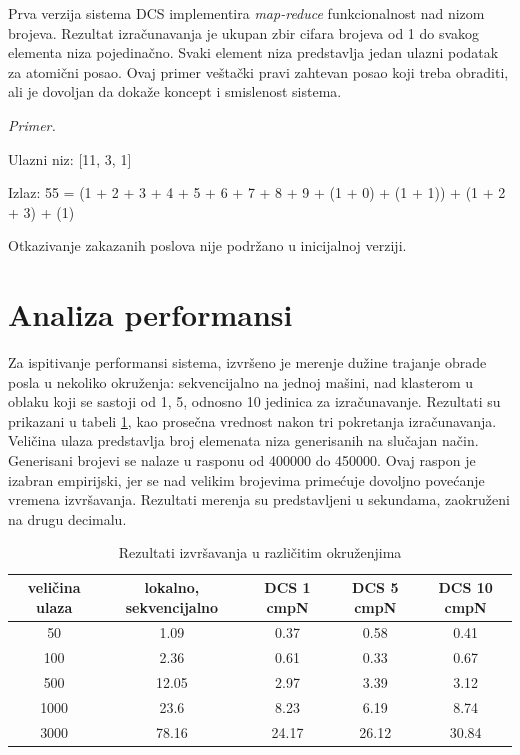 \documentclass[12pt,oneside]{memoir}
\begin{document}
Prva verzija sistema DCS implementira \emph{map-reduce} funkcionalnost nad nizom brojeva. Rezultat izračunavanja je ukupan zbir cifara brojeva od 1 do svakog elementa niza pojedinačno. Svaki element niza predstavlja jedan ulazni podatak za atomični posao. Ovaj primer veštački pravi zahtevan posao koji treba obraditi, ali je dovoljan da dokaže koncept i smislenost sistema.

\emph{Primer.}

Ulazni niz: [11, 3, 1]

Izlaz: 55 = (1 + 2 + 3 + 4 + 5 + 6 + 7 + 8 + 9 + (1 + 0) + (1 + 1)) + (1 + 2 + 3) + (1)

Otkazivanje zakazanih poslova nije podržano u inicijalnoj verziji.

\section{Analiza performansi}

Za ispitivanje performansi sistema, izvršeno je merenje dužine trajanje obrade posla u nekoliko okruženja: sekvencijalno na jednoj mašini, nad klasterom u oblaku koji se sastoji od 1, 5, odnosno 10 jedinica za izračunavanje. Rezultati su prikazani u tabeli \ref{tbl:rezultati}, kao prosečna vrednost nakon tri pokretanja izračunavanja. Veličina ulaza predstavlja broj elemenata niza generisanih na slučajan način. Generisani brojevi se nalaze u rasponu od 400000 do 450000. Ovaj raspon je izabran empirijski, jer se nad velikim brojevima primećuje dovoljno povećanje vremena izvršavanja. Rezultati merenja su predstavljeni u sekundama, zaokruženi na drugu decimalu.

\begin{table}
\centering
\begin{center}
\begin{tabular}{ |c||c|c|c|c| } 
 \hline
  veličina ulaza & lokalno, sekvencijalno & DCS 1 cmpN & DCS 5 cmpN & DCS 10 cmpN \\ 
 \hline
 50 & 1.09 & 0.37 & 0.58 & 0.41 \\ 
 100 & 2.36 & 0.61 & 0.33 & 0.67 \\ 
 500 & 12.05 & 2.97 & 3.39 & 3.12 \\ 
 1000 & 23.6 & 8.23 & 6.19 & 8.74 \\ 
 3000 & 78.16 & 24.17 & 26.12 & 30.84 \\ 
 \hline
\end{tabular}
\caption{Rezultati izvršavanja u različitim okruženjima}
\label{tbl:rezultati}
\end{center}
\end{table}
\end{document}
